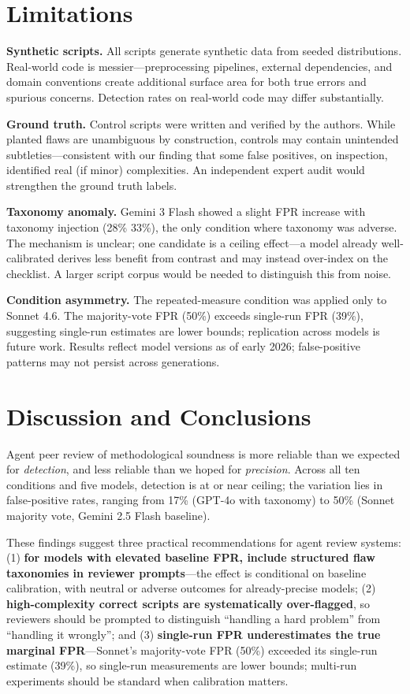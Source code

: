 \documentclass[10pt,twocolumn]{article}
\begin{document}
\section{Limitations}
\label{sec:limitations}

\textbf{Synthetic scripts.} All scripts generate synthetic data from seeded
distributions. Real-world code is messier---preprocessing pipelines, external
dependencies, and domain conventions create additional surface area for both
true errors and spurious concerns. Detection rates on real-world code may
differ substantially.

\textbf{Ground truth.} Control scripts were written and verified by the authors.
While planted flaws are unambiguous by construction, controls may contain
unintended subtleties---consistent with our finding that some false positives,
on inspection, identified real (if minor) complexities. An independent expert
audit would strengthen the ground truth labels.

\textbf{Taxonomy anomaly.} Gemini 3 Flash showed a slight FPR increase with
taxonomy injection (28\%\,\to\,33\%), the only condition where taxonomy was
adverse. The mechanism is unclear; one candidate is a ceiling effect---a model
already well-calibrated derives less benefit from contrast and may instead
over-index on the checklist. A larger script corpus would be needed to
distinguish this from noise.

\textbf{Condition asymmetry.} The repeated-measure condition was applied only
to Sonnet 4.6. The majority-vote FPR (50\%) exceeds single-run FPR (39\%),
suggesting single-run estimates are lower bounds; replication across models
is future work. Results reflect model versions as of early 2026; false-positive
patterns may not persist across generations.

\section{Discussion and Conclusions}

Agent peer review of methodological soundness is more reliable than
we expected for \emph{detection}, and less reliable than we hoped for
\emph{precision}. Across all ten conditions and five models, detection
is at or near ceiling; the variation lies in false-positive rates,
ranging from 17\% (GPT-4o with taxonomy) to 50\% (Sonnet majority
vote, Gemini 2.5 Flash baseline).

These findings suggest three practical recommendations for agent review
systems: (1) \textbf{for models with elevated baseline FPR, include
structured flaw taxonomies in reviewer prompts}---the effect is
conditional on baseline calibration, with neutral or adverse outcomes
for already-precise models; (2) \textbf{high-complexity correct scripts
are systematically over-flagged}, so reviewers should be prompted to
distinguish ``handling a hard problem'' from ``handling it wrongly'';
and (3) \textbf{single-run FPR underestimates the true marginal
FPR}---Sonnet's majority-vote FPR (50\%) exceeded its single-run
estimate (39\%), so single-run measurements are lower bounds;
multi-run experiments should be standard when calibration matters.
\end{document}
